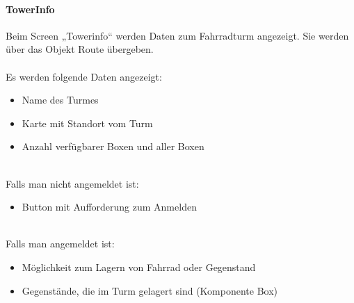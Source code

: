 \paragraph{TowerInfo}Beim Screen „Towerinfo“ werden Daten zum Fahrradturm angezeigt. Sie werden über das Objekt Route übergeben.\\
\mbox{}\\
Es werden folgende Daten angezeigt:
\begin{itemize}
  \item Name des Turmes
  \item Karte mit Standort vom Turm
  \item Anzahl verfügbarer Boxen und aller Boxen
\end{itemize}
\mbox{}\\
Falls man nicht angemeldet ist:
\begin{itemize}
  \item Button mit Aufforderung zum Anmelden
\end{itemize}
\mbox{}\\
Falls man angemeldet ist:
\begin{itemize}
  \item Möglichkeit zum Lagern von Fahrrad oder Gegenstand
  \item Gegenstände, die im Turm gelagert sind (Komponente Box)
\end{itemize}

